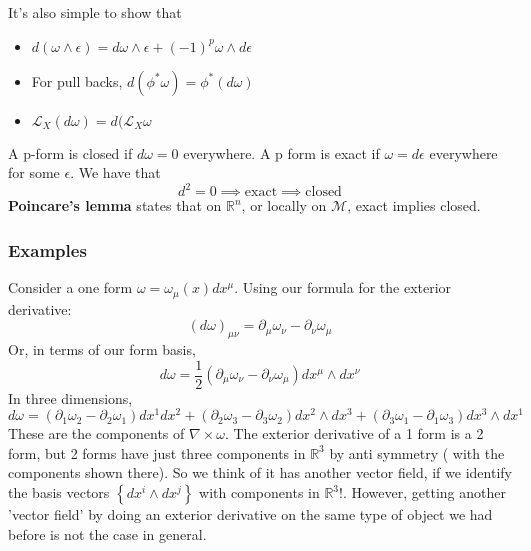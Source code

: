 It's also simple to show that 
\begin{itemize}
\item $ d ( \omega  \wedge \epsilon ) = d \omega  \wedge  \epsilon + ( - 1)^ p \omega  \wedge  d \epsilon $
\item For pull backs, $ d ( \phi^ * \omega  ) = \phi^* ( d \omega  ) $
\item $ \mathcal{ L }_X ( d \omega  ) = d ( \mathcal{ L }_ X \omega $
\end{itemize}
A p-form is closed if $ d \omega   = 0 $ everywhere. 
A p form is exact if $ \omega   = d \epsilon$ everywhere for some $ \epsilon$. 
We have that  
\[
d^ 2 = 0 \implies \text{exact} \implies \text{closed} 
\] 
\textbf{Poincare's lemma} states that on $ \mathbb{ R}^n$, or locally on  $ \mathcal{  M }$, exact implies closed. 

\pagebreak 
\subsubsection{Examples} 
Consider a one form $ \omega = \omega_\mu( x) dx^\mu $. Using our formula for the exterior derivative: 
\[
( d \omega)_{ \mu \nu } = \partial _\mu \omega_\nu - \partial  _\nu \omega_\mu 
\] Or, in terms of our form basis, 
\[
d \omega = \frac{1}{2 } ( \partial _\mu \omega_\nu - \partial _\nu \omega _\mu ) dx^\mu \wedge  dx ^ \nu 
\] In three dimensions, 
\[
d \omega = ( \partial_1 \omega_2 - \partial_2 \omega_1 ) dx^ 1 dx ^ 2 + ( \partial_2 \omega_3 -\partial_3 \omega_2 ) dx^ 2 \wedge  dx^ 3 + ( \partial_3 \omega_1 - \partial_1 \omega_3  ) dx^ 3 \wedge  dx^ 1 
\] These are the components of $ \nabla \times \omega $. 
The exterior derivative of a 1 form is a 2 form, but 2 forms have just three components in $ \mathbb{ R} ^3$ by anti symmetry ( with the components shown there). So we think of it has another vector field, if we identify the basis vectors $ \left\{  dx^ i \wedge  dx^ j  \right\} $ with components in $ \mathbb{R}^ 3 $!. 
However, getting another 'vector field' by doing an exterior derivative on the 
same type of object we had before is not the case in general.


